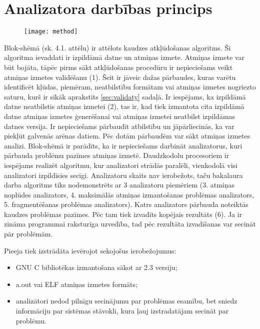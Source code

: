 ﻿\section{Analizatora darbības princips}

 \begin{figure}[h]
\begin{center}
\texttt{[image: method]}
\end{center}
\caption{\textbf{\fontsize{11}{12}\selectfont {Uz metodi balstītā algoritma blok-shēma}}}
\end{figure}

Blok-shēmā (sk. 4.1. attēlu) ir attēlots kaudzes atkļūdošanas algoritms.
Šī algoritma ievaddati ir izpildāmā datne un atmiņas izmete.
Atmiņas izmete var būt bojāta, tāpēc pirms sākt atkļūdošanas procedūru ir nepieciešams veikt atmiņas izmetes validēšanu (1).
Šeit ir jāveic dažas pārbaudes, kuras varētu identificēt kļūdas, piemēram, neatbilstību formātam vai atmiņas izmetes nogriezto saturu, kurš ir sīkāk aprakstīts \ref{sec:validaty} sadaļā.
Ir iespējams, ka izpildāmā datne neatbilstis atmiņas izmetei (2), tas ir, kad tiek izmantota cita izpildāmā datne atmiņas izmetes ģenerēšanai vai atmiņas izmetei neatbilst izpildāmas datnes versija.
Ir nepieciešams pārbaudīt atbilstību un jāpārliecinās, ka var piekļūt galvenās arēnas datiem.
Pēc dotām pārbaudēm var sākt atmiņas izmetes analīzi.
Blok-shēmā ir parādīts, ka ir nepieciešams darbināt analizatorus, kuri  pārbauda problēmu pazīmes atmiņas izmetē.
Daudzkodolu procesoriem ir iespējams realizēt algoritmu, kur analizatori strādās paralēli, vienkodolā visi analizatori izpildīsies secīgi. 
Analizatoru skaits nav ierobežots, taču bakalaura darba algoritms tiks nodemonstrēts ar 3 analizatoru piemēriem (3. atmiņas noplūdes analizators, 4. maksimālās atmiņas izmantošanas problēmas analizators, 5. fragmentēšanas problēmas analizators). 
Katrs analizators pārbauda noteiktās kaudzes problēmas pazīmes. 
Pēc tam tiek izvadīts kopējais rezultāts (6).
Ja ir zināma programmai raksturīga uzvedība, tad pēc rezultāta izvadīšanas var secināt pār problēmām.

Pieeja tiek izstrādāta ievērojot sekojošus ierobežojumus: %
\begin{itemize}
	\item GNU C bibliotēkas izmantošana sākot ar 2.3 versiju;
    \item a.out vai ELF atmiņas izmetes formāts;
    \item analizātori nedod pilnīgu secinājumu par problēmas esamību, bet sniedz informāciju par sistēmas stāvokli, kura ļauj izstradatājam secināt par problēmu.
\end{itemize} 




